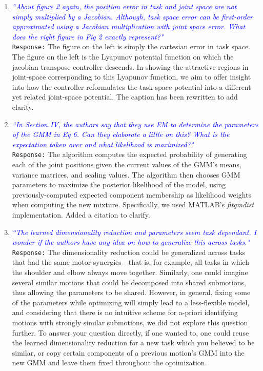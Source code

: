 \documentclass{article}
\begin{document}
\begin{enumerate}
\item \textcolor{blue}{\textit{``About figure 2 again, the position error in task and joint space are not simply multiplied by a Jacobian.
Although, task space error can be first-order approximated using a Jacobian multiplication with
joint space error. What does the right figure in Fig 2 exactly represent?"}}\\
\texttt{Response:} \small The figure on the left is simply the cartesian error in task space. The figure on the left is the Lyapunov potential function on which the jacobian transpose controller descends. In showing the attractive regions in joint-space corresponding to this Lyapunov function, we aim to offer insight into how the controller reformulates the task-space potential into a different yet related joint-space potential. The caption has been rewritten to add clarity.\\

\item \textcolor{blue}{\textit{``In Section IV, the authors say that they use EM to determine the parameters of the GMM in Eq 6. Can
they elaborate a little on this? What is the expectation taken over and what likelihood is maximized?"}}\\
\texttt{Response:} \small The algorithm computes the expected probability of generating each of the joint positions given the current values of the GMM's means, variance matrices, and scaling values. The algorithm then chooses GMM parameters to maximize the posterior likelihood of the model, using previously-computed expected component membership as likelihood weights when computing the new mixture. Specifically, we used MATLAB's \textit{fitgmdist} implementation. Added a citation to clarify.\\

\item \textcolor{blue}{\textit{``The learned dimensionality reduction and parameters seem task dependant. I wonder if the authors
have any idea on how to generalize this across tasks."}}\\
\texttt{Response:} \small The dimensionality reduction could be generalized across tasks that had the same motor synergies - that is, for example, all tasks in which the shoulder and elbow always move together. Similarly, one could imagine several similar motions that could be decomposed into shared submotions, thus allowing the parameters to be shared. However, in general, fixing some of the parameters while optimizing will simply lead to a less-flexible model, and considering that there is no intuitive scheme for a-priori identifying motions with strongly similar submotions, we did not explore this question further. To answer your question directly, if one wanted to, one could reuse the learned dimensionality reduction for a new task which you believed to be similar, or copy certain components of a previous motion's GMM into the new GMM and leave them fixed throughout the optimization.\\


\end{enumerate}
\end{document}
